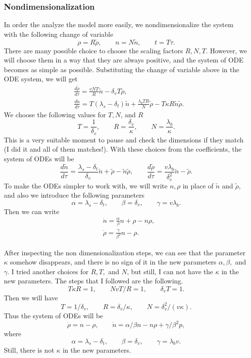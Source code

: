\subsubsection*{Nondimensionalization}
In order the analyze the model more easily, we nondimensionalize the system with the following change of variable
\[ \rho = R \tilde{\rho}, \qquad n = N \tilde{n}, \qquad t = T \tau. \]
There are many possible choice to choose the scaling factors $R, N, T$. However, we will choose them in a way that they are always positive, and the system of ODE becomes as simple as possible. Substituting the change of variable above in the ODE system, we will get
\begin{align*}
	&\frac{d\tilde{\rho}}{d\tau} = \frac{vNT}{R}\tilde{n} - \delta_v T \tilde{\rho},\\
	&\frac{d\tilde{n}}{d\tau} = T(\lambda_s-\delta_t)\tilde{n} + \frac{\lambda_b T R}{N} \tilde{\rho} - T\kappa R \tilde{n}\tilde{\rho}. \tag{\twonotes}
\end{align*}
We choose the following values for $T,N$, and $R$
\[ T = \frac{1}{\delta_v}, \qquad R = \frac{\delta_v}{\kappa}, \qquad N = \frac{\lambda_b}{\kappa}. \]
This is a very suitable moment to pause and check the dimensions if they match (I did it and all of them matches!). With these choices from the coefficients, the system of ODEs will be
\[ \frac{d\tilde{n}}{d \tau} = \frac{\lambda_s - \delta_t}{\delta_v} \tilde{n} + \tilde{\rho} - \tilde{n}\tilde{\rho}, \qquad
\frac{d\tilde{\rho}}{d\tau} = \frac{v\lambda_b}{\delta_v^2}\tilde{n} - \tilde{\rho}. \]
To make the ODEs simpler to work with, we will write $n,\rho$ in place of $\tilde{n}$ and $\tilde{\rho}$, and also we introduce the following parameters
\[ \alpha = \lambda_s - \delta_t, \qquad \beta =\delta_v, \qquad \gamma = v\lambda_b. \tag{$\clubsuit$} \]
Then we can write 
\begin{equation*}
	\boxed{
		\begin{aligned}
			&\dot{n} = \frac{\alpha}{\beta}n + \rho - n\rho, \\
			&\dot{\rho} = \frac{\gamma}{\beta^2}n -\rho.
		\end{aligned}
	}
	\tag{\smiley}
\end{equation*}

\begin{observation}
	After inspecting the non dimensionalization steps, we can see that the parameter $ \kappa $ somehow disappears, and there is no sign of it in the new parameters $ \alpha, \beta, $ and $ \gamma $. I tried another choices for $ R, T, $ and $ N $, but still, I can not have the $ \kappa $ in the new parameters. The steps that I followed are the following.
	\[ T \kappa R = 1, \qquad NvT/R = 1, \qquad \delta_v T = 1. \]
	Then we will have
	\[ T = 1/\delta_v, \qquad R = \delta_v/\kappa, \qquad N = \delta_v^2/(v\kappa). 
	\]
	Thus the system of ODEs will be
	\[ \dot{\rho} = n - \rho, \qquad \dot{n}= \alpha/\beta n - n\rho + \gamma/\beta^2 p, \]
	where
	\[ \alpha = \lambda_s - \delta_t, \qquad \beta=\delta_v, \qquad \gamma = \lambda_b v. \]
	Still, there is not $ \kappa $ in the new parameters. 
\end{observation}

